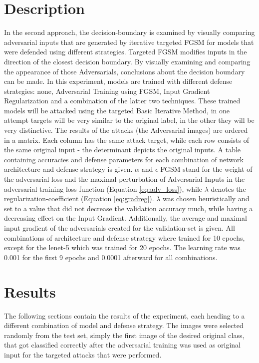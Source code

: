 \documentclass[draft,final]{vutinfth} %
\begin{document}
\section{Description}
In the second approach, the decision-boundary is examined by visually comparing adversarial inputs that are generated by iterative targeted FGSM for models that were defended using different strategies.
Targeted FGSM modifies inputs in the direction of the closest decision boundary.
By visually examining and comparing the appearance of those Adversarials, conclusions about the decision boundary can be made.
In this experiment, models are trained with different defense strategies: none, Adversarial Training using FGSM, Input Gradient Regularization and a combination of the latter two techniques.
These trained models will be attacked using the targeted Basic Iterative Method, in one attempt targets will be very similar to the original label, in the other they will be very distinctive.
The results of the attacks (the Adversarial images) are ordered in a matrix.
Each column has the same attack target, while each row consists of the same original input - the determinant depicts the original inputs.
A table containing accuracies and defense parameters for each combination of network architecture and defense strategy is given.
$\alpha$ and $\epsilon$ FGSM stand for the weight of the adversarial loss and the maximal perturbation of Adversarial Inputs in the adversarial training loss function (Equation \ref{eq:adv_loss}), while $\lambda$ denotes the regularization-coefficient (Equation \ref{eq:gradreg}). $\lambda$ was chosen heuristically and set to a value that did not decrease the validation accuracy much, while having a decreasing effect on the Input Gradient.
Additionally, the average and maximal input gradient of the adversarials created for the validation-set is given.
All combinations of architecture and defense strategy where trained for 10 epochs, except for the lenet-5 which was trained for 20 epochs.
The learning rate was 0.001 for the first 9 epochs and 0.0001 afterward for all combinations.

\section{Results}

The following sections contain the results of the experiment, each heading to a different combination of model and defense strategy.
The images were selected randomly from the test set, simply the first image of the desired original class, that got classified correctly after the adversarial training was used as original input for the targeted attacks that were performed.
\end{document}

